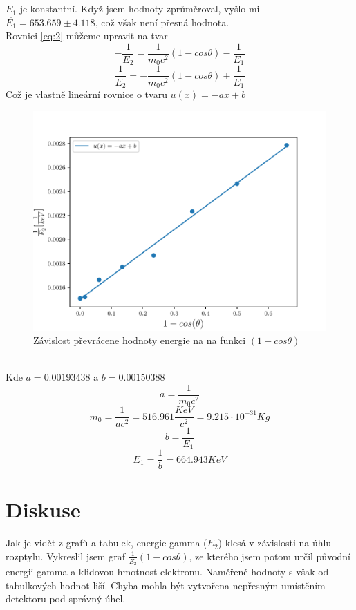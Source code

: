 \documentclass{article}
\begin{document}
\\
\vspace{1em}
\\
$E_{1}$ je konstantní. Když jsem hodnoty zprůměroval, vyšlo mi\\
$\overline{E_{1}} = 653.659 \pm 4.118$, což však není přesná hodnota.
\newpage
\\
Rovnici \ref{eq:2} můžeme upravit na tvar\\
$$- \frac{1}{E_{2}} = \frac{1}{m_{0}c^{2}} (1-cos\theta) - \frac{1}{E_{1}}$$
$$\frac{1}{E_{2}} = -\frac{1}{m_{0}c^{2}} (1-cos\theta) + \frac{1}{E_{1}}$$
Což je vlastně lineární rovnice o tvaru $u(x) = -ax + b$
\begin{figure}[h]
  \hspace*{-1em}
  \includegraphics[scale=0.8]{figs/fig2.pdf}
  \caption{Závislost převrácene hodnoty energie na na funkci $(1-cos\theta)$}
\end{figure}
\\
Kde $a = 0.00193438$ a $b = 0.00150388$\\
$$a = \frac{1}{m_{0}c^{2}}$$
$$m_{0} = \frac{1}{ac^{2}} = 516.961 \frac{KeV}{c^{2}} = 9.215 \cdot 10^{-31} Kg$$
$$b = \frac{1}{E_{1}}$$
$$E_{1} = \frac{1}{b} = 664.943 KeV$$
\newpage
\section{Diskuse}
Jak je vidět z grafů a tabulek, energie gamma ($E_{2}$) klesá v závislosti na úhlu rozptylu.
Vykreslil jsem graf $\frac{1}{E_{2}}(1-cos\theta)$, ze kterého jsem potom určil původní
energii gamma a klidovou hmotnost elektronu. Naměřené hodnoty s však od tabulkových
hodnot liší. Chyba mohla být vytvořena nepřesným umístěním detektoru pod správný úhel.
\end{document}

